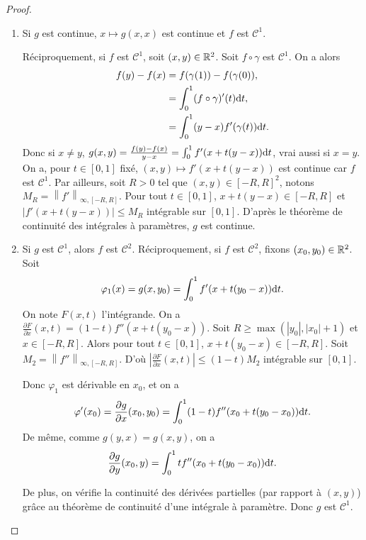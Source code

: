 \documentclass[12pt]{article}
\begin{document}
\begin{proof}
	\phantom{}
	\begin{enumerate}
		\item Si $g$ est continue, $x\mapsto g(x,x)$ est continue et $f$ est $\mathcal{C}^{1}$.
		
		Réciproquement, si $f$ est $\mathcal{C}^{1}$, soit $(x,y)\in\mathbb{R}^{2}$. Soit 
		$f\circ \gamma$ est $\mathcal{C}^{1}$. On a alors 
		\begin{align}
			f(y)-f(x)
			&=f(\gamma(1))-f(\gamma(0)),\\
			&=\int_{0}^{1}(f\circ\gamma)'(t)\mathrm{d} t,\\
			&=\int_{0}^{1}(y-x)f'(\gamma(t))\mathrm{d} t.
		\end{align}
		Donc si $x\neq y$, $g(x,y)=\frac{f(y)-f(x)}{y-x}=\int_{0}^{1}f'(x+t(y-x))\mathrm{d} t$, vrai aussi si $x=y$. On a, pour $t\in[0,1]$ fixé, $(x,y)\mapsto f'(x+t(y-x))$ est continue car $f$ est $\mathcal{C}^{1}$. Par ailleurs, soit $R>0$ tel que $(x,y)\in[-R,R]^{2}$, notons $M_R=\left\lVert f'\right\rVert_{\infty,[-R,R]}$. Pour tout $t\in[0,1]$, $x+t(y-x)\in[-R,R]$ et $\left\lvert f'(x+t(y-x))\right\rvert\leqslant M_R$ intégrable sur $[0,1]$. D'après le théorème de continuité des intégrales à paramètres, $g$ est continue.

		\item Si $g$ est $\mathcal{C}^{1}$, alors $f$ est $\mathcal{C}^{2}$.
		Réciproquement, si $f$ est $\mathcal{C}^{2}$, fixons $(x_0,y_0)\in\mathbb{R}^{2}$. Soit 
		\begin{equation}
			\varphi_1(x)=g(x,y_0)=\int_{0}^{1}f'(x+t(y_0-x))\mathrm{d} t.
		\end{equation}
		On note $F(x,t)$ l'intégrande. On a $\frac{\partial F}{\partial x}(x,t)=(1-t)f''(x+t(y_0-x))$. Soit $R\geqslant\max(\left\lvert y_0\right\rvert,\left\lvert x_0\right\rvert+1)$ et $x\in[-R,R]$. Alors pour tout $t\in[0,1]$, $x+t(y_0-x)\in[-R,R]$. Soit $M_2=\left\lVert f''\right\rVert_{\infty,[-R,R]}$. D'où $\left\lvert\frac{\partial F}{\partial x}(x,t)\right\rvert\leqslant(1-t)M_2$ intégrable sur $[0,1]$. 

		Donc $\varphi_1$ est dérivable en $x_0$, et on a 
		\begin{equation}
			\varphi'(x_0)=\frac{\partial g}{\partial x}(x_0,y_0)=\int_{0}^{1}(1-t)f''(x_0+t(y_0-x_0))\mathrm{d} t.
		\end{equation}
		De même, comme $g(y,x)=g(x,y)$, on a 
		\begin{equation}
			\frac{\partial g}{\partial y}(x_0,y)=\int_{0}^{1}tf''(x_{0}+t(y_{0}-x_{0}))\mathrm{d} t.
		\end{equation}

		De plus, on vérifie la continuité des dérivées partielles (par rapport à $(x,y)$) grâce au théorème de continuité d'une intégrale à paramètre. Donc $g$ est $\mathcal{C}^{1}$.
	\end{enumerate}
\end{proof}
\end{document}
